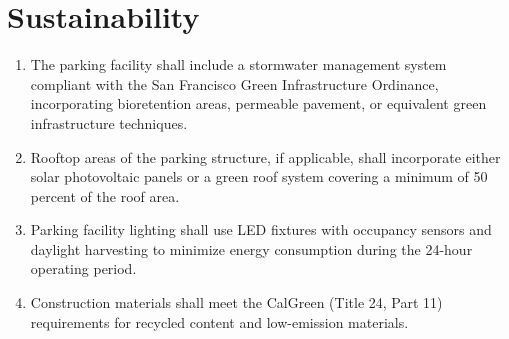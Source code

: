 \section{Sustainability}

\begin{enumerate}[label=(\alph*)]
\item The parking facility shall include a stormwater management system
  compliant with the San Francisco Green Infrastructure Ordinance,
  incorporating bioretention areas, permeable pavement, or equivalent
  green infrastructure techniques.

\item Rooftop areas of the parking structure, if applicable, shall incorporate
  either solar photovoltaic panels or a green roof system covering a minimum
  of 50 percent of the roof area.

\item Parking facility lighting shall use LED fixtures with occupancy sensors
  and daylight harvesting to minimize energy consumption during the 24-hour
  operating period.

\item Construction materials shall meet the CalGreen (Title 24, Part 11)
  requirements for recycled content and low-emission materials.
\end{enumerate}

